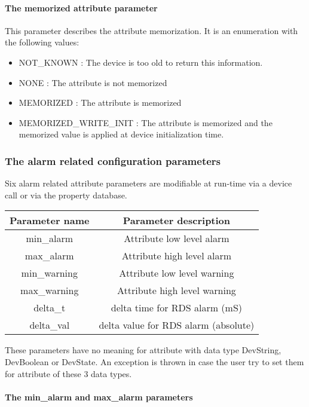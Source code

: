 \paragraph{The memorized attribute parameter}

This parameter describes the attribute memorization. It is an enumeration
with the following values:
\begin{itemize}
\item NOT\_KNOWN : The device is too old to return this information.
\item NONE : The attribute is not memorized
\item MEMORIZED : The attribute is memorized
\item MEMORIZED\_WRITE\_INIT : The attribute is memorized and the memorized
value is applied at device initialization time.
\end{itemize}

\subsubsection{The alarm related configuration parameters}

Six alarm related attribute parameters are modifiable at run-time
via a device call or via the property database. 

\vspace{0.3cm}


\begin{center}
\begin{longtable}{|c|c|}
\hline 
Parameter name & Parameter description\tabularnewline
\hline 
\hline 
min\_alarm & Attribute low level alarm\tabularnewline
\hline 
max\_alarm & Attribute high level alarm\tabularnewline
\hline 
min\_warning & Attribute low level warning\tabularnewline
\hline 
max\_warning & Attribute high level warning\tabularnewline
\hline 
delta\_t & delta time for RDS alarm (mS)\tabularnewline
\hline 
delta\_val & delta value for RDS alarm (absolute)\tabularnewline
\hline 
\end{longtable}
\par\end{center}

\vspace{0.3cm}
These parameters have no meaning for attribute with data type DevString,
DevBoolean or DevState. An exception is thrown in case the user try
to set them for attribute of these 3 data types.


\paragraph{The min\_alarm and max\_alarm
parameters}

